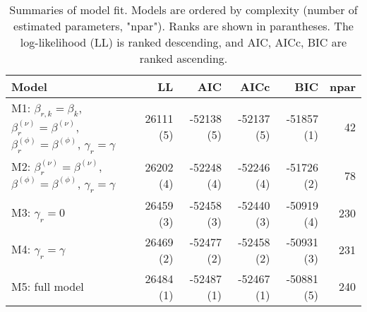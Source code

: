 \begin{table}[ht]
\centering
\begingroup\fontsize{9pt}{10pt}\selectfont
\begin{tabular}{l|rrrrr}
  \hline
Model & LL & AIC & AICc & BIC & npar \\ 
  \hline
M1: $\beta_{r,k} = \beta_{k}$, $\beta_{r}^{(\nu)} = \beta^{(\nu)}$, $\beta_{r}^{(\phi)} = \beta^{(\phi)}$, $\gamma_r = \gamma$ & 26111 (5) & -52138 (5) & -52137 (5) & -51857 (1) & 42 \\ 
  M2: $\beta_{r}^{(\nu)} = \beta^{(\nu)}$, $\beta^{(\phi)} = \beta^{(\phi)}$, $\gamma_r = \gamma$ & 26202 (4) & -52248 (4) & -52246 (4) & -51726 (2) & 78 \\ 
  M3: $\gamma_r = 0$ & 26459 (3) & -52458 (3) & -52440 (3) & -50919 (4) & 230 \\ 
  M4: $\gamma_r = \gamma$ & 26469 (2) & -52477 (2) & -52458 (2) & -50931 (3) & 231 \\ 
  M5: full model & 26484 (1) & -52487 (1) & -52467 (1) & -50881 (5) & 240 \\ 
   \hline
\end{tabular}
\endgroup
\caption{Summaries of model fit.
             Models are ordered by complexity (number of estimated parameters, "npar").
             Ranks are shown in parantheses.
             The log-likelihood (LL) is ranked descending,
             and AIC, AICc, BIC are ranked ascending.} 
\label{tab:mBetafit}
\end{table}

